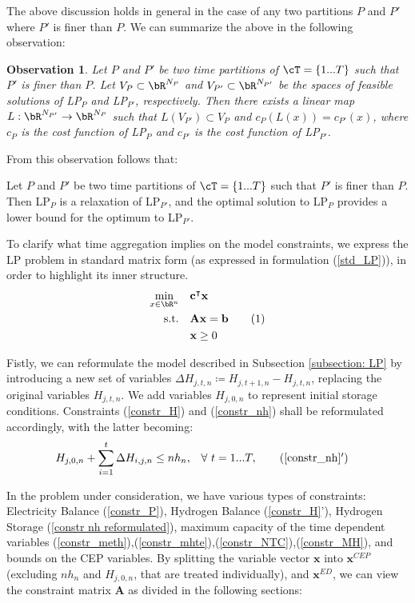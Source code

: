 \documentclass[smallextended,natbib]{svjour3}       %
\newtheorem{observation}[theorem]{Observation}
\numberwithin{definition}{section}
\numberwithin{theorem}{section}
\numberwithin{proposition}{section}
\begin{document}
The above discussion holds in general in the case of any two partitions $P$ and $P'$ where $P'$ is finer than $P$.
We can summarize the above in the following observation:
\begin{observation}
Let $P$ and $P'$ be two time partitions of $\cT=\{1...T\}$ such that $P'$ is finer than $P$. Let \(V_{P} \subset \bR^{N_{P}}\) and \(V_{P'} \subset \bR^{N_{P'}}\) be the spaces of feasible solutions of LP\(_{P}\) and LP\(_{P'}\), respectively. Then there exists a linear map \(L: \bR^{N_{P'}} \to \bR^{N_{P}}\) such that \(L(V_{P'}) \subset V_{P}\) and \(c_{P}(L(x)) = c_{P'}(x)\), where \(c_{P}\) is the cost function of LP\(_{P}\) and \(c_{P'}\) is the cost function of LP\(_{P'}\).
\end{observation}

From this observation follows that:
\begin{proposition}
  Let $P$ and $P'$ be two time partitions of $\cT=\{1...T\}$ such that $P'$ is finer than $P$. Then LP$_P$ is a relaxation of LP$_{P'}$, and the optimal solution to LP$_{P}$ provides a lower bound for the optimum to LP$_{P'}$.
\end{proposition}

To clarify what time aggregation implies on the model constraints, we express the LP problem in standard matrix form (as expressed in formulation (\ref{std_LP})), in order to highlight its inner structure.
\begin{align*}\label{std_LP}
\min_{x \in \bR^{n}}\quad &\mathbf{c}^\intercal \mathbf{x} \\ 
\text{s.t.} \quad& \mathbf{A}\mathbf{x} = \mathbf{b} \stepcounter{equation}\tag{\theequation}\\
&\mathbf{x} \geq 0
\end{align*}

Fistly, we can reformulate the model described in Subsection \ref{subsection: LP} by introducing a new set of variables \(\Delta H_{j,t,n} \coloneqq H_{j,t+1,n} - H_{j,t,n}\), replacing the original variables \(H_{j,t,n}\). 
We add variables $H_{j,0,n}$ to represent initial storage conditions.
Constraints (\ref{constr_H}) and (\ref{constr_nh}) shall be reformulated accordingly, with the latter becoming:
\begin{align}
  H_{j,0,n} + \sum_{i=1}^{t} \Delta H_{i,j,n} \le nh_{n}, & \quad \forall\  t =1...T, \tag{\ref{constr_nh}$'$}\label{constr nh reformulated}
\end{align}

In the problem under consideration, we have various types of constraints: Electricity Balance (\ref{constr_P}), Hydrogen Balance (\ref{constr_H}'), Hydrogen Storage (\ref{constr nh reformulated}), maximum capacity of the time dependent variables (\ref{constr_meth}),(\ref{constr_mhte}),(\ref{constr_NTC}),(\ref{constr_MH}), and bounds on the CEP variables.
By splitting the variable vector $\mathbf{x}$ into $\mathbf{x}^{CEP}$ (excluding $nh_n$ and $H_{j,0,n}$, that are treated individually), and $\mathbf{x}^{ED}$, we can view the constraint matrix $\mathbf{A}$ as divided in the following sections:
\end{document}
